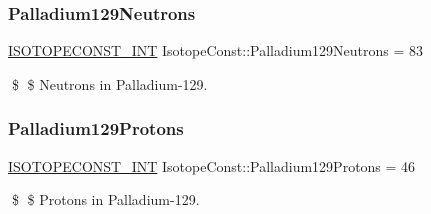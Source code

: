 \subsubsection{\texorpdfstring{Palladium129\+Neutrons}{Palladium129Neutrons}}
{\footnotesize\ttfamily \mbox{\hyperlink{group___isotope_const-_macros_ga5f18360b3e99483a35c32d789e62621c}{I\+S\+O\+T\+O\+P\+E\+C\+O\+N\+S\+T\+\_\+\+I\+NT}} Isotope\+Const\+::\+Palladium129\+Neutrons = 83}

\$ \$ Neutrons in Palladium-\/129. \mbox{\label{group___isotope_const-_palladium-_pd129_ga8cae33f757805cdcd7e59dd0db162c90}} 
\subsubsection{\texorpdfstring{Palladium129\+Protons}{Palladium129Protons}}
{\footnotesize\ttfamily \mbox{\hyperlink{group___isotope_const-_macros_ga5f18360b3e99483a35c32d789e62621c}{I\+S\+O\+T\+O\+P\+E\+C\+O\+N\+S\+T\+\_\+\+I\+NT}} Isotope\+Const\+::\+Palladium129\+Protons = 46}

\$ \$ Protons in Palladium-\/129. 